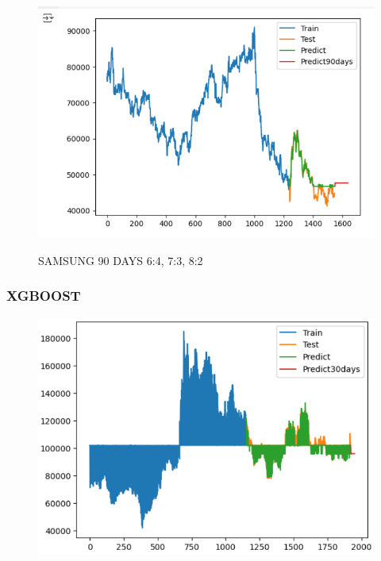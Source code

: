 \documentclass{article}
\begin{document}
\begin{multicols}{2}
\begin{figure}[H]
\begin{minipage}{0.15\textwidth}
    \label{fig:2}
    \end{minipage}%
    \begin{minipage}{0.15\textwidth}
    \centering
    \includegraphics[width=1\textwidth]{Image/GradientBoosting/SAMSUNG_90_8_2_GradientBoostingRegressor.png}

    \label{fig:3}
    \end{minipage}
    \caption{SAMSUNG 90 DAYS  6:4, 7:3, 8:2 }
\end{figure} 

\subsubsection{XGBOOST}


\begin{figure}[H]
    \centering
    \begin{minipage}{0.15\textwidth}
    \centering
    \includegraphics[width=1\textwidth]{Image/XGBoost/LG_6_4_30.png}
   

\end{minipage}
\end{figure}
\end{multicols}
\end{document}
